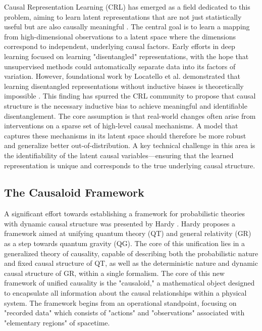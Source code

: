 {Causal Representation Learning (CRL) has emerged as a field dedicated to this problem, aiming to learn latent representations that are not just statistically useful but are also causally meaningful \cite{Scholkopf2021Toward}. The central goal is to learn a mapping from high-dimensional observations to a latent space where the dimensions correspond to independent, underlying causal factors.
Early efforts in deep learning focused on learning "disentangled" representations, with the hope that unsupervised methods could automatically separate data into its factors of variation. However, foundational work by Locatello et al. demonstrated that learning disentangled representations without inductive biases is theoretically impossible \cite{Locatello2019Challenging}. This finding has spurred the CRL community to propose that causal structure is the necessary inductive bias to achieve meaningful and identifiable disentanglement. The core assumption is that real-world changes often arise from interventions on a sparse set of high-level causal mechanisms. A model that captures these mechanisms in its latent space should therefore be more robust and generalize better out-of-distribution. A key technical challenge in this area is the identifiability of the latent causal variables—ensuring that the learned representation is unique and corresponds to the true underlying causal structure. 

\subsection{The Causaloid Framework}

A significant effort towards establishing a framework for probabilistic theories with dynamic causal structure was presented by Hardy \cite{hardy2005probability}. Hardy proposes a framework aimed at unifying quantum theory (QT) and general relativity (GR) as a step towards quantum gravity (QG). The core of this unification lies in a generalized theory of causality, capable of describing both the probabilistic nature and fixed causal structure of QT, as well as the deterministic nature and dynamic causal structure of GR, within a single formalism. The core of this new framework of unified causality is the "causaloid," a mathematical object designed to encapsulate all information about the causal relationships within a physical system. The framework begins from an operational standpoint, focusing on "recorded data" which consists of "actions" and "observations" associated with "elementary regions" of spacetime.

}
